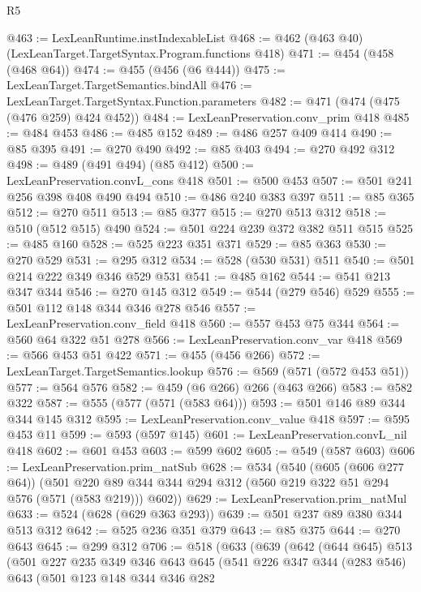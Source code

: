 \begin{lexlean}{R5}
\begin{coremodule}
@463 := LexLeanRuntime.instIndexableList
@468 := @462 (@463 @40) (LexLeanTarget.TargetSyntax.Program.functions @418)
@471 := @454 (@458 (@468 @64))
@474 := @455 (@456 (@6 @444))
@475 := LexLeanTarget.TargetSemantics.bindAll
@476 := LexLeanTarget.TargetSyntax.Function.parameters
@482 := @471 (@474 (@475 (@476 @259) @424 @452))
@484 := LexLeanPreservation.conv_prim @418
@485 := @484 @453
@486 := @485 @152
@489 := @486 @257 @409 @414
@490 := @85 @395
@491 := @270 @490
@492 := @85 @403
@494 := @270 @492 @312
@498 := @489 (@491 @494) (@85 @412)
@500 := LexLeanPreservation.convL_cons @418
@501 := @500 @453
@507 := @501 @241 @256 @398 @408 @490 @494
@510 := @486 @240 @383 @397
@511 := @85 @365
@512 := @270 @511
@513 := @85 @377
@515 := @270 @513 @312
@518 := @510 (@512 @515) @490
@524 := @501 @224 @239 @372 @382 @511 @515
@525 := @485 @160
@528 := @525 @223 @351 @371
@529 := @85 @363
@530 := @270 @529
@531 := @295 @312
@534 := @528 (@530 @531) @511
@540 := @501 @214 @222 @349 @346 @529 @531
@541 := @485 @162
@544 := @541 @213 @347 @344
@546 := @270 @145 @312
@549 := @544 (@279 @546) @529
@555 := @501 @112 @148 @344 @346 @278 @546
@557 := LexLeanPreservation.conv_field @418
@560 := @557 @453 @75 @344
@564 := @560 @64 @322 @51 @278
@566 := LexLeanPreservation.conv_var @418
@569 := @566 @453 @51 @422
@571 := @455 (@456 @266)
@572 := LexLeanTarget.TargetSemantics.lookup
@576 := @569 (@571 (@572 @453 @51))
@577 := @564 @576
@582 := @459 (@6 @266) @266 (@463 @266)
@583 := @582 @322
@587 := @555 (@577 (@571 (@583 @64)))
@593 := @501 @146 @89 @344 @344 @145 @312
@595 := LexLeanPreservation.conv_value @418
@597 := @595 @453 @11
@599 := @593 (@597 @145)
@601 := LexLeanPreservation.convL_nil @418
@602 := @601 @453
@603 := @599 @602
@605 := @549 (@587 @603)
@606 := LexLeanPreservation.prim_natSub
@628 := @534
    (@540
      (@605 (@606 @277 @64))
      (@501 @220 @89 @344 @344 @294 @312 (@560 @219 @322 @51 @294 @576 (@571 (@583 @219))) @602))
@629 := LexLeanPreservation.prim_natMul
@633 := @524 (@628 (@629 @363 @293))
@639 := @501 @237 @89 @380 @344 @513 @312
@642 := @525 @236 @351 @379
@643 := @85 @375
@644 := @270 @643
@645 := @299 @312
@706 := @518
    (@633
      (@639
        (@642
          (@644 @645)
          @513
          (@501
            @227
            @235
            @349
            @346
            @643
            @645
            (@541
              @226
              @347
              @344
              (@283 @546)
              @643
              (@501
                @123
                @148
                @344
                @346
                @282

\end{coremodule}
\end{lexlean}
